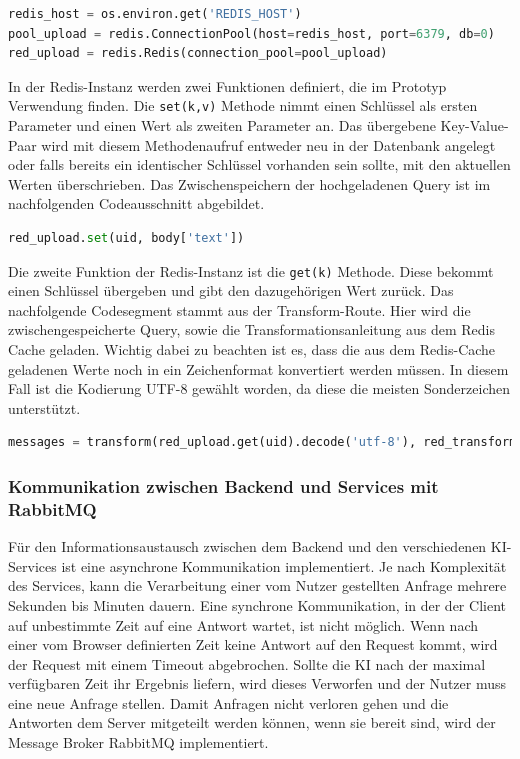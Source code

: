 \begin{lstlisting}[language=Python, caption={Aufsetzen der Redis-Verbindung}]
redis_host = os.environ.get('REDIS_HOST')
pool_upload = redis.ConnectionPool(host=redis_host, port=6379, db=0)
red_upload = redis.Redis(connection_pool=pool_upload)
\end{lstlisting}

In der Redis-Instanz werden zwei Funktionen definiert, die im Prototyp Verwendung finden. Die \texttt{set(k,v)} Methode nimmt einen Schlüssel als ersten Parameter und einen Wert als zweiten Parameter an. Das übergebene Key-Value-Paar wird mit diesem Methodenaufruf entweder neu in der Datenbank angelegt oder falls bereits ein identischer Schlüssel vorhanden sein sollte, mit den aktuellen Werten überschrieben. Das Zwischenspeichern der hochgeladenen Query ist im nachfolgenden Codeausschnitt abgebildet.  

\begin{lstlisting}[language=Python, caption={Set-Funktion aus Redis}]
red_upload.set(uid, body['text'])
\end{lstlisting}

Die zweite Funktion der Redis-Instanz ist die \texttt{get(k)} Methode. Diese bekommt einen Schlüssel übergeben und gibt den dazugehörigen Wert zurück. Das nachfolgende Codesegment stammt aus der Transform-Route. Hier wird die zwischengespeicherte Query, sowie die Transformationsanleitung aus dem Redis Cache geladen. Wichtig dabei zu beachten ist es, dass die aus dem Redis-Cache geladenen Werte noch in ein Zeichenformat konvertiert werden müssen. In diesem Fall ist die Kodierung UTF-8 gewählt worden, da diese die meisten Sonderzeichen unterstützt.

\begin{lstlisting}[language=Python, caption={Get-Funktion aus Redis}]
messages = transform(red_upload.get(uid).decode('utf-8'), red_transform.get(uid))
\end{lstlisting}

\subsubsection{Kommunikation zwischen Backend und Services mit RabbitMQ}
Für den Informationsaustausch zwischen dem Backend und den verschiedenen KI-Services ist eine asynchrone Kommunikation implementiert. Je nach Komplexität des Services, kann die Verarbeitung einer vom Nutzer gestellten Anfrage mehrere Sekunden bis Minuten dauern. Eine synchrone Kommunikation, in der der Client auf unbestimmte Zeit auf eine Antwort wartet, ist nicht möglich. Wenn nach einer vom Browser definierten Zeit keine Antwort auf den Request kommt, wird der Request mit einem Timeout abgebrochen. Sollte die KI nach der maximal verfügbaren Zeit ihr Ergebnis liefern, wird dieses Verworfen und der Nutzer muss eine neue Anfrage stellen. Damit Anfragen nicht verloren gehen und die Antworten dem Server mitgeteilt werden können, wenn sie bereit sind, wird der Message Broker RabbitMQ implementiert. 

